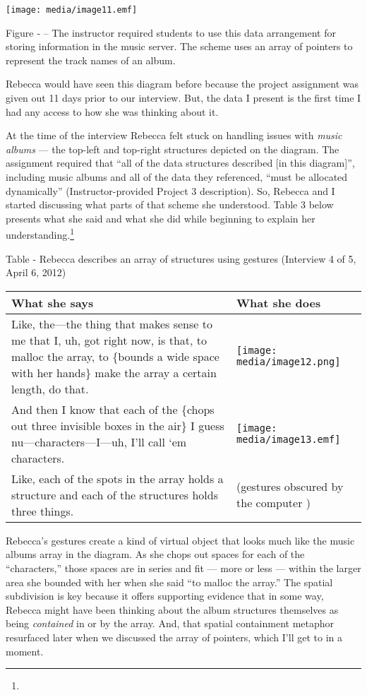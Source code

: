 \texttt{[image: media/image11.emf]}

\protect\hypertarget{ux5fToc252445972}{}{}Figure ‑ -- The instructor
required students to use this data arrangement for storing information
in the music server. The scheme uses an array of pointers to represent
the track names of an album.

Rebecca would have seen this diagram before because the project
assignment was given out 11 days prior to our interview. But, the data I
present is the first time I had any access to how she was thinking about
it.

At the time of the interview Rebecca felt stuck on handling issues with
\emph{music albums} --- the top-left and top-right structures depicted
on the diagram. The assignment required that ``all of the data
structures described {[}in this diagram{]}'', including music albums and
all of the data they referenced, ``must be allocated dynamically''
(Instructor-provided Project 3 description). So, Rebecca and I started
discussing what parts of that scheme she understood. Table 3 below
presents what she said and what she did while beginning to explain her
understanding.\footnote{}

\protect\hypertarget{ux5fToc252445961}{}{}Table - Rebecca describes an
array of structures using gestures (Interview 4 of 5, April 6, 2012)

\begin{longtable}[]{@{}ll@{}}
\toprule
What she says & What she does\tabularnewline
\midrule
\endhead
Like, the---the thing that makes sense to me that I, uh, got right now,
is that, to malloc the array, to \{bounds a wide space with her hands\}
make the array a certain length, do that. &
\texttt{[image: media/image12.png]}\tabularnewline
And then I know that each of the \{chops out three invisible boxes in
the air\} I guess nu---characters---I---uh, I'll call `em characters. &
\texttt{[image: media/image13.emf]}\tabularnewline
Like, each of the spots in the array holds a structure and each of the
structures holds three things. & (gestures obscured by the computer
)\tabularnewline
\bottomrule
\end{longtable}

Rebecca's gestures create a kind of virtual object that looks much like
the music albums array in the diagram. As she chops out spaces for each
of the ``characters,'' those spaces are in series and fit --- more or
less --- within the larger area she bounded with her when she said ``to
malloc the array.'' The spatial subdivision is key because it offers
supporting evidence that in some way, Rebecca might have been thinking
about the album structures themselves as being \emph{contained} in or by
the array. And, that spatial containment metaphor resurfaced later when
we discussed the array of pointers, which I'll get to in a moment.

